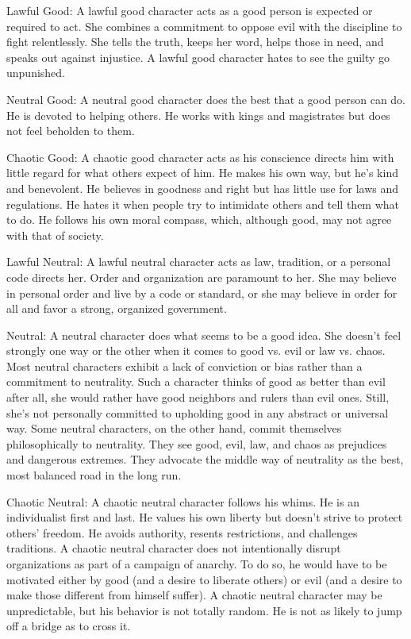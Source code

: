 \begin{itemize*}
	\item{Lawful Good:} A lawful good character acts as a good person is expected or required to act. She combines a commitment to oppose evil with the discipline to fight relentlessly. She tells the truth, keeps her word, helps those in need, and speaks out against injustice. A lawful good character hates to see the guilty go unpunished. 
	\item{Neutral Good:} A neutral good character does the best that a good person can do. He is devoted to helping others. He works with kings and magistrates but does not feel beholden to them.
	\item{Chaotic Good:} A chaotic good character acts as his conscience directs him with little regard for what others expect of him. He makes his own way, but he's kind and benevolent. He believes in goodness and right but has little use for laws and regulations. He hates it when people try to intimidate others and tell them what to do. He follows his own moral compass, which, although good, may not agree with that of society. 
	\item{Lawful Neutral:} A lawful neutral character acts as law, tradition, or a personal code directs her. Order and organization are paramount to her. She may believe in personal order and live by a code or standard, or she may believe in order for all and favor a strong, organized government. 
	\item{Neutral:} A neutral character does what seems to be a good idea. She doesn't feel strongly one way or the other when it comes to good vs. evil or law vs. chaos. Most neutral characters exhibit a lack of conviction or bias rather than a commitment to neutrality. Such a character thinks of good as better than evil after all, she would rather have good neighbors and rulers than evil ones. Still, she's not personally committed to upholding good in any abstract or universal way. Some neutral characters, on the other hand, commit themselves philosophically to neutrality. They see good, evil, law, and chaos as prejudices and dangerous extremes. They advocate the middle way of neutrality as the best, most balanced road in the long run. 
	\item{Chaotic Neutral:} A chaotic neutral character follows his whims. He is an individualist first and last. He values his own liberty but doesn't strive to protect others' freedom. He avoids authority, resents restrictions, and challenges traditions. A chaotic neutral character does not intentionally disrupt organizations as part of a campaign of anarchy. To do so, he would have to be motivated either by good (and a desire to liberate others) or evil (and a desire to make those different from himself suffer). A chaotic neutral character may be unpredictable, but his behavior is not totally random. He is not as likely to jump off a bridge as to cross it. 

\end{itemize*}
